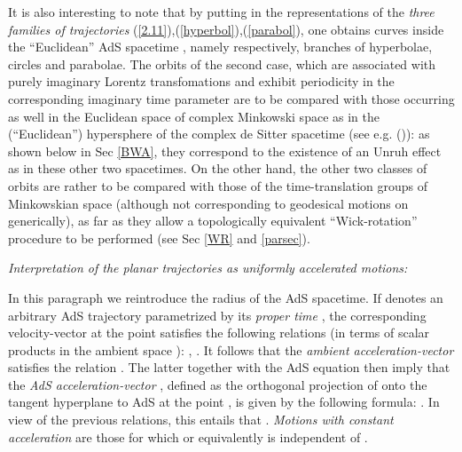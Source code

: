 \documentclass[a4paper,a4paper]{article}
\begin{document}
It is also interesting to note that by putting \coordHE{}
in the representations of the {\sl three families of trajectories}
(\ref{2.11}),(\ref{hyperbol}),(\ref{parabol}), one obtains curves
inside the ``Euclidean'' AdS spacetime \coordHE{},
namely respectively, branches of hyperbolae, circles and
parabolae. The orbits of the second case,
which are associated with purely imaginary
Lorentz transfomations and exhibit periodicity
in the corresponding imaginary time
parameter are to be compared with those occurring
as well in the Euclidean space of complex Minkowski space
as in the (``Euclidean'') hypersphere of the
complex de Sitter spacetime (see e.g. (\cite{BEM})):
as shown below in Sec \ref{BWA}, they correspond to
the existence of an Unruh effect as in these other two spacetimes.
On the other hand,
the other two classes of orbits
are rather to be compared with those of the time-translation
groups of Minkowskian space (although not corresponding to
geodesical motions on \coordHE{} generically),
as far as they allow a topologically equivalent  ``Wick-rotation''
procedure to be performed (see Sec \ref{WR} and \ref{parsec}).

\vskip 0.3cm
\noindent
{\sl Interpretation of the planar trajectories as
uniformly accelerated motions:}

\vskip 0.2cm
In this paragraph we reintroduce the radius \coordHE{} of the AdS spacetime.
If \coordHE{} denotes an arbitrary AdS trajectory parametrized by its
{\sl proper time} \coordHE{}, the corresponding velocity-vector
\coordHE{} at the point \coordHE{}
satisfies the following relations
(in terms of scalar products in the ambient space \coordHE{}):
\coordHE{}, \coordHE{}. It follows that the  {\sl ambient
acceleration-vector}
\coordHE{}
satisfies the relation \coordHE{}.
The latter together with the AdS equation \coordHE{} then
imply that the {\sl AdS acceleration-vector} \coordHE{},
defined as the
\coordHE{}orthogonal projection of \coordHE{} onto the tangent hyperplane
to AdS at the point \coordHE{}, is given by the following formula:
\coordHE{}.
In view of the previous relations, this entails that
\coordHE{}.
{\sl Motions with constant acceleration} are those for which
\coordHE{} or equivalently
\coordHE{} is independent of \coordHE{}.
\end{document}

